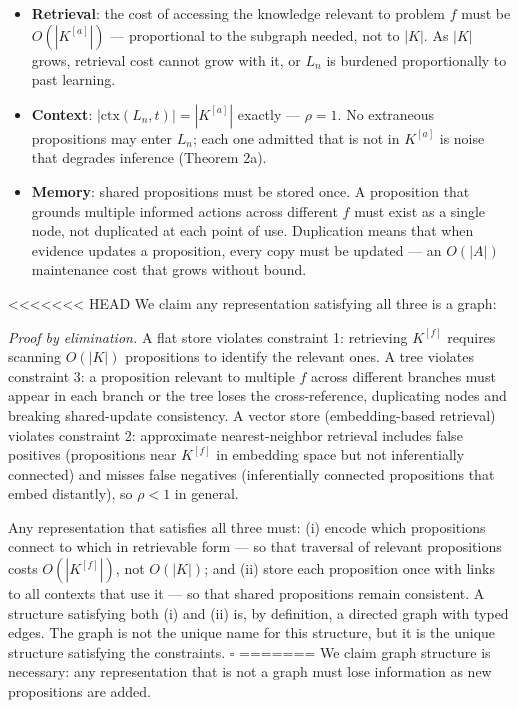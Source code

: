 \documentclass[
]{article}
\providecommand{\tightlist}{%
  \setlength{\itemsep}{0pt}\setlength{\parskip}{0pt}}
\begin{document}
\begin{itemize}
\tightlist
\item
  \textbf{Retrieval}: the cost of accessing the knowledge relevant to
  problem \(f\) must be \(O(|K^{[a]}|)\) --- proportional to the
  subgraph needed, not to \(|K|\). As \(|K|\) grows, retrieval cost
  cannot grow with it, or \(L_n\) is burdened proportionally to past
  learning.
\item
  \textbf{Context}: \(|\text{ctx}(L_n, t)| = |K^{[a]}|\) exactly ---
  \(\rho = 1\). No extraneous propositions may enter \(L_n\); each one
  admitted that is not in \(K^{[a]}\) is noise that degrades inference
  (Theorem 2a).
\item
  \textbf{Memory}: shared propositions must be stored once. A
  proposition that grounds multiple informed actions across different
  \(f\) must exist as a single node, not duplicated at each point of
  use. Duplication means that when evidence updates a proposition, every
  copy must be updated --- an \(O(|A|)\) maintenance cost that grows
  without bound.
\end{itemize}

<<<<<<< HEAD
We claim any representation satisfying all three is a graph:

\emph{Proof by elimination.} A flat store violates constraint 1:
retrieving \(K^{[f]}\) requires scanning \(O(|K|)\) propositions to
identify the relevant ones. A tree violates constraint 3: a proposition
relevant to multiple \(f\) across different branches must appear in each
branch or the tree loses the cross-reference, duplicating nodes and
breaking shared-update consistency. A vector store (embedding-based
retrieval) violates constraint 2: approximate nearest-neighbor retrieval
includes false positives (propositions near \(K^{[f]}\) in embedding
space but not inferentially connected) and misses false negatives
(inferentially connected propositions that embed distantly), so
\(\rho < 1\) in general.

Any representation that satisfies all three must: (i) encode which
propositions connect to which in retrievable form --- so that traversal
of relevant propositions costs \(O(|K^{[f]}|)\), not \(O(|K|)\); and
(ii) store each proposition once with links to all contexts that use it
--- so that shared propositions remain consistent. A structure
satisfying both (i) and (ii) is, by definition, a directed graph with
typed edges. The graph is not the unique name for this structure, but it
is the unique structure satisfying the constraints. \(\square\)
=======
We claim graph structure is necessary: any representation that is not a
graph must lose information as new propositions are added.
\end{document}
